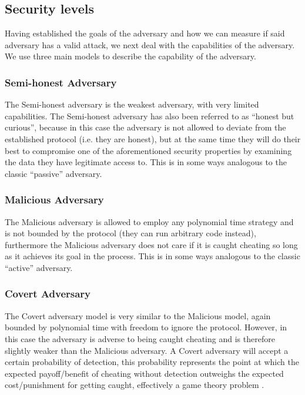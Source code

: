 \documentclass[a4paper,11pt]{article}
\begin{document}

		\subsection{Security levels}\label{sub:SecurityLevels}
			Having established the goals of the adversary and how we can measure if said adversary has a valid attack, we next deal with the capabilities of the adversary. We use three main models to describe the capability of the adversary.

			\subsubsection{Semi-honest Adversary}
				The Semi-honest adversary is the weakest adversary, with very limited capabilities. The Semi-honest adversary has also been referred to as ``honest but curious'', because in this case the adversary is not allowed to deviate from the established protocol (i.e. they are honest), but at the same time they will do their best to compromise one of the aforementioned security properties by examining the data they have legitimate access to. This is in some ways analogous to the classic ``passive'' adversary.

			\subsubsection{Malicious Adversary}
				The Malicious adversary is allowed to employ any polynomial time strategy and is not bounded by the protocol (they can run arbitrary code instead), furthermore the Malicious adversary does not care if it is caught cheating so long as it achieves its goal in the process. This is in some ways analogous to the classic ``active'' adversary.

			\subsubsection{Covert Adversary}
				The Covert adversary model is very similar to the Malicious model, again bounded by polynomial time with freedom to ignore the protocol. However, in this case the adversary is adverse to being caught cheating and is therefore slightly weaker than the Malicious adversary. A Covert adversary will accept a certain probability of detection, this probability represents the point at which the expected payoff/benefit of cheating without detection outweighs the expected cost/punishment for getting caught, effectively a game theory problem \cite{WhenGameTheoryMetSMC}.\\
\end{document}
